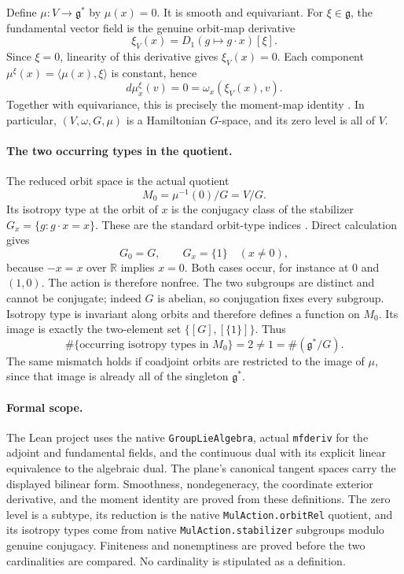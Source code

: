 \documentclass[11pt,a4paper]{article}
\newcommand{\R}{\mathbb R}
\newcommand{\g}{\mathfrak g}
\begin{document}
Define $\mu:V\to\g^*$ by $\mu(x)=0$. It is smooth and equivariant.
For $\xi\in\g$, the fundamental vector field is the genuine orbit-map
derivative
\[
 \xi_V(x)=D_1(g\mapsto g\cdot x)[\xi].
\]
Since $\xi=0$, linearity of this derivative gives $\xi_V(x)=0$.
Each component $\mu^\xi(x)=\langle\mu(x),\xi\rangle$ is constant, hence
\[
 d\mu^\xi_x(v)=0=\omega_x(\xi_V(x),v).
\]
Together with equivariance, this is precisely the moment-map identity
\cite[Definition~22.1]{cannas}. In particular, $(V,\omega,G,\mu)$ is a
Hamiltonian $G$-space, and its zero level is all of $V$.

\paragraph{The two occurring types in the quotient.}
The reduced orbit space is the actual quotient
\[
 M_0=\mu^{-1}(0)/G=V/G.
\]
Its isotropy type at the orbit of $x$ is the conjugacy class of the
stabilizer $G_x=\{g:g\cdot x=x\}$. These are the standard orbit-type
indices \cite[Example~1.2 and Theorem~2.1]{sl}.
Direct calculation gives
\[
 G_0=G,\qquad G_x=\{1\}\quad(x\ne0),
\]
because $-x=x$ over $\R$ implies $x=0$. Both cases occur, for instance
at $0$ and $(1,0)$. The action is therefore nonfree. The two subgroups
are distinct and cannot be conjugate; indeed $G$ is abelian, so
conjugation fixes every subgroup. Isotropy type is invariant along
orbits and therefore defines a function on $M_0$. Its image is exactly
the two-element set $\{[G],[\{1\}]\}$. Thus
\[
 \#\{\text{occurring isotropy types in }M_0\}=2
 \ne1=\#(\g^*/G).
\]
The same mismatch holds if coadjoint orbits are restricted to the image
of $\mu$, since that image is already all of the singleton $\g^*$.

\paragraph{Formal scope.}
The Lean project uses the native \texttt{GroupLieAlgebra}, actual
\texttt{mfderiv} for the adjoint and fundamental fields, and the
continuous dual with its explicit linear equivalence to the algebraic
dual. The plane's canonical tangent spaces carry the displayed
bilinear form. Smoothness, nondegeneracy, the coordinate exterior
derivative, and the moment identity are proved from these definitions.
The zero level is a subtype, its reduction is the native
\texttt{MulAction.orbitRel} quotient, and its isotropy types come from
native \texttt{MulAction.stabilizer} subgroups modulo genuine
conjugacy. Finiteness and nonemptiness are proved before the two
cardinalities are compared. No cardinality is stipulated as a definition.
\end{document}
